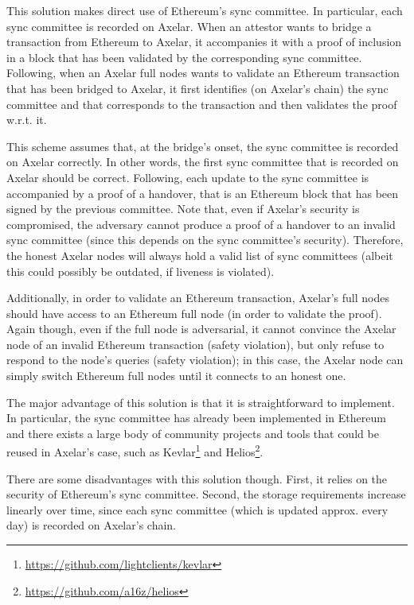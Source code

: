 This solution makes direct use of Ethereum's sync committee. In particular,
each sync committee is recorded on Axelar. When an attestor wants to bridge a
transaction from Ethereum to Axelar, it accompanies it with a proof of
inclusion in a block that has been validated by the corresponding sync
committee. Following, when an Axelar full nodes wants to validate an Ethereum
transaction that has been bridged to Axelar, it first identifies (on Axelar's
chain) the sync committee and that corresponds to the transaction and then
validates the proof w.r.t. it.

This scheme assumes that, at the bridge's onset, the sync committee is recorded
on Axelar correctly. In other words, the first sync committee that is recorded
on Axelar should be correct. Following, each update to the sync committee is
accompanied by a proof of a handover, that is an Ethereum block that has been
signed by the previous committee. Note that, even if Axelar's security is
compromised, the adversary cannot produce a proof of a handover to an invalid
sync committee (since this depends on the sync committee's security).
Therefore, the honest Axelar nodes will always hold a valid list of sync
committees (albeit this could possibly be outdated, if liveness is violated).

Additionally, in order to validate an Ethereum transaction, Axelar's full nodes
should have access to an Ethereum full node (in order to validate the proof).
Again though, even if the full node is adversarial, it cannot convince the
Axelar node of an invalid Ethereum transaction (safety violation), but only
refuse to respond to the node's queries (safety violation); in this case, the
Axelar node can simply switch Ethereum full nodes until it connects to an
honest one.

The major advantage of this solution is that it is straightforward to
implement. In particular, the sync committee has already been implemented in
Ethereum and there exists a large body of community projects and tools that
could be reused in Axelar's case, such as
Kevlar\footnote{\url{https://github.com/lightclients/kevlar}} and
Helios\footnote{\url{https://github.com/a16z/helios}}.

There are some disadvantages with this solution though. First, it relies on the
security of Ethereum's sync committee. Second, the storage requirements
increase linearly over time, since each sync committee (which is updated
approx. every day) is recorded on Axelar's chain.

